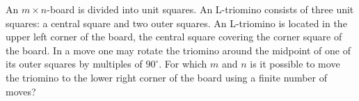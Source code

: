 An $m \times n$-board is divided into unit squares. An L-triomino consists of three unit
squares: a central square and two outer squares. An L-triomino is located in the upper left corner of the board,
the central square covering the corner square of the board. In a move one may rotate the triomino around the
midpoint of one of its outer squares by multiples of $90^\circ$. For which $m$ and $n$ is it possible to move
the triomino to the lower right corner of the board using a finite number of moves?